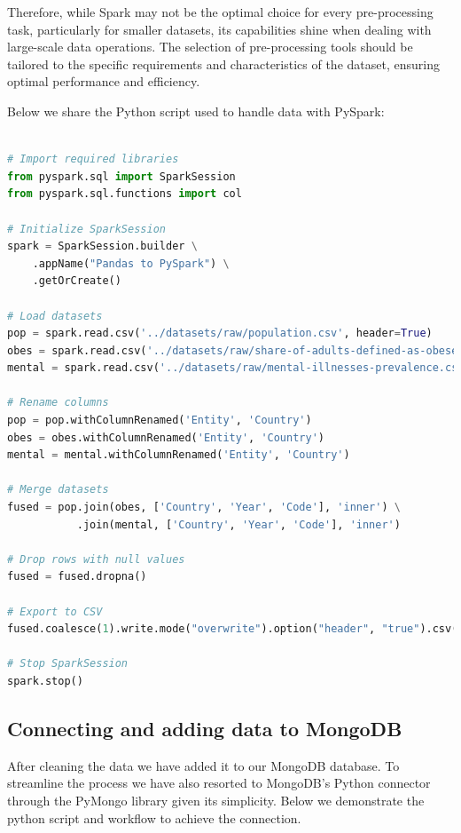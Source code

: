 \documentclass[runningheads]{llncs}
\begin{document}
Therefore, while Spark may not be the optimal choice for every pre-processing task, particularly for smaller datasets, its capabilities shine when dealing with large-scale data operations. The selection of pre-processing tools should be tailored to the specific requirements and characteristics of the dataset, ensuring optimal performance and efficiency.

Below we share the Python script used to handle data with PySpark:

\begin{lstlisting}[language=Python,caption={Handling data with Python PySpark},label={lst:example}]

# Import required libraries
from pyspark.sql import SparkSession
from pyspark.sql.functions import col

# Initialize SparkSession
spark = SparkSession.builder \
    .appName("Pandas to PySpark") \
    .getOrCreate()

# Load datasets
pop = spark.read.csv('../datasets/raw/population.csv', header=True)
obes = spark.read.csv('../datasets/raw/share-of-adults-defined-as-obese.csv', header=True)
mental = spark.read.csv('../datasets/raw/mental-illnesses-prevalence.csv', header=True)

# Rename columns
pop = pop.withColumnRenamed('Entity', 'Country')
obes = obes.withColumnRenamed('Entity', 'Country')
mental = mental.withColumnRenamed('Entity', 'Country')

# Merge datasets
fused = pop.join(obes, ['Country', 'Year', 'Code'], 'inner') \
           .join(mental, ['Country', 'Year', 'Code'], 'inner')

# Drop rows with null values
fused = fused.dropna()

# Export to CSV
fused.coalesce(1).write.mode("overwrite").option("header", "true").csv('../datasets/processed/spark_processed_data')

# Stop SparkSession
spark.stop()
\end{lstlisting}

\subsection{Connecting and adding data to MongoDB}

After cleaning the data we have added it to our MongoDB database. To streamline the process we have also resorted to MongoDB's Python connector through the PyMongo library given its simplicity. Below we demonstrate the python script and workflow to achieve the connection.
\end{document}
